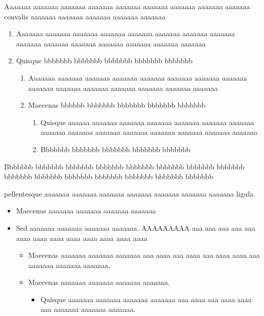 \documentclass{article}
\begin{document}


Aaaaaaa aaaaaaa aaaaaaa aaaaaaa aaaaaaa aaaaaaa aaaaaaa aaaaaaa aaaaaaa convalis aaaaaaa aaaaaaa aaaaaaa aaaaaaa aaaaaaa	
\begin{enumerate}
	\item Aaaaaaa aaaaaaa aaaaaaa aaaaaaa aaaaaaa aaaaaaa aaaaaaa aaaaaaa aaaaaaa aaaaaaa aaaaaaa aaaaaaa aaaaaaa aaaaaaa aaaaaaa
	\item Quisque bbbbbbb bbbbbbb bbbbbbb bbbbbbb bbbbbbb
	\begin{enumerate}
		\item Aaaaaaa aaaaaaa aaaaaaa aaaaaaa aaaaaaa aaaaaaa aaaaaaa aaaaaaa aaaaaaa aaaaaaa aaaaaaa aaaaaaa aaaaaaa aaaaaaa aaaaaaa
		\item Maecenas bbbbbb bbbbbbb bbbbbbb bbbbbbb bbbbbbb
		\begin{enumerate}
			\item Quisque aaaaaa aaaaaaa aaaaaaa aaaaaaa aaaaaaa aaaaaaa aaaaaaa aaaaaaa aaaaaaa aaaaaaa aaaaaaa aaaaaaa aaaaaaa aaaaaaa aaaaaaa
			\item Bbbbbbb bbbbbbb bbbbbbb bbbbbbb bbbbbbb
		\end{enumerate}
	\end{enumerate}
\end{enumerate}
Bbbbbbb bbbbbbb bbbbbbb bbbbbbb bbbbbbb bbbbbbb bbbbbbb bbbbbbb bbbbbbb bbbbbbb bbbbbbb bbbbbbb bbbbbbb bbbbbbb bbbbbbb


\bigskip
\bigskip



\noindent pellentesque  aaaaaaa aaaaaaa aaaaaaa aaaaaaa aaaaaaa aaaaaaa aaaaaaa ligula.
\begin{itemize}
	\item Maecenas aaaaaaa aaaaaaa aaaaaaa aaaaaaa
	\item Sed aaaaaaa aaaaaaa aaaaaaa aaaaaaa. AAAAAAAAA aaa aaa aaa aaa aaa aaaa aaaa aaaa aaaa aaaa aaaa aaaa aaaa
\begin{itemize}
	\item Maecenas  aaaaaaa aaaaaaa aaaaaaa aaa aaaa aaa aaaa aaa aaaa aaaa aaa aaaaaaa aaaaaaa aaaaaaa.
	\item Maecenas aaaaaaa aaaaaaa aaaaaaa aaaaaaa.
	\begin{itemize}
		\item Quisque  aaaaaaa aaaaaaa aaaaaaa aaaaaaa aaa aaaa aaa aaaa aaaa aaa aaaaaaa aaaaaaa aaaaaaa.
	\end{itemize}
\end{itemize}
\end{itemize}
\end{document}
